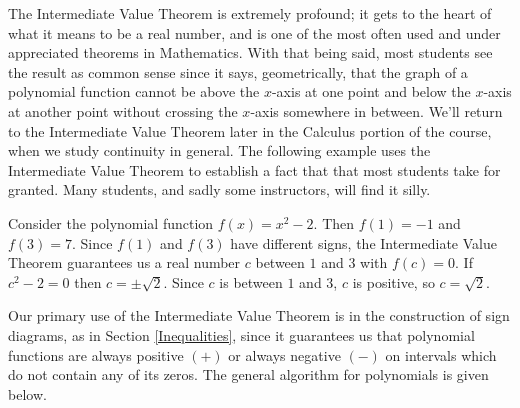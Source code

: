 
\smallskip

The Intermediate Value Theorem is extremely profound;  it gets to the heart of what it means to be a real number, and is one of the most often used and under appreciated theorems in Mathematics.  With that being said, most students see the result as common sense since it says, geometrically, that the graph of a polynomial function cannot be above the $x$-axis at one point and below the $x$-axis at another point without crossing the $x$-axis somewhere in between. We'll return to the Intermediate Value Theorem later in the Calculus portion of the course, when we study continuity in general.  The following example uses the Intermediate Value Theorem to establish a fact that that most students take for granted.  Many students, and sadly some instructors, will find it silly.

\medskip


{Consider the polynomial function $f(x) = x^2 - 2$.  Then $f(1) = -1$ and $f(3) = 7$.  Since $f(1)$ and $f(3)$ have different signs, the Intermediate Value Theorem guarantees us a real number $c$ between $1$ and $3$ with $f(c) = 0$.  If $c^2 - 2 = 0$ then $c = \pm \sqrt{2}$.  Since $c$ is between $1$ and $3$, $c$ is positive, so $c = \sqrt{2}$.}

\medskip


Our primary use of the Intermediate Value Theorem is in the construction of sign diagrams, as in Section \ref{Inequalities}, since it guarantees us that polynomial functions are always positive $(+)$ or always negative $(-)$ on intervals which do not contain any of its zeros.  The general algorithm for polynomials is given below.

\smallskip

